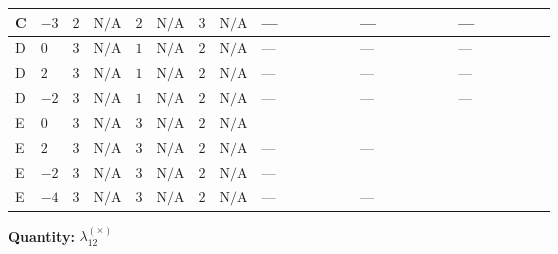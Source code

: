 \documentclass[8pt]{article}
\begin{document}
\begin{landscape}
\begin{longtable}{@{}llcccccc >{\raggedright\arraybackslash}p{0.21\linewidth} >{\raggedright\arraybackslash}p{0.21\linewidth} >{\raggedright\arraybackslash}p{0.21\linewidth}@{}}
\midrule
C & $-3$ & $2$ & $\text{N/A}$ & $2$ & $\text{N/A}$ & $3$ & $\text{N/A}$ & --- & --- & --- \\
\midrule
D & $0$ & $3$ & $\text{N/A}$ & $1$ & $\text{N/A}$ & $2$ & $\text{N/A}$ & --- & --- & --- \\
\midrule
D & $2$ & $3$ & $\text{N/A}$ & $1$ & $\text{N/A}$ & $2$ & $\text{N/A}$ & --- & --- & --- \\
\midrule
D & $-2$ & $3$ & $\text{N/A}$ & $1$ & $\text{N/A}$ & $2$ & $\text{N/A}$ & --- & --- & --- \\
\midrule
E & $0$ & $3$ & $\text{N/A}$ & $3$ & $\text{N/A}$ & $2$ & $\text{N/A}$ & \scriptsize\adjustbox{max width=\linewidth}{$\begin{gathered} +4 {\lambda_{X_{9}}} \left({\lambda_{X_{5}}^{(2)}}\right)^{*}\end{gathered}$} & \scriptsize\adjustbox{max width=\linewidth}{$\begin{gathered} -{\lambda_{X_{14}}} \left({\lambda_{X_{14}}}\right)^{*}\end{gathered}$} & \scriptsize\adjustbox{max width=\linewidth}{$\begin{gathered} +\frac{51 {g_2}^4}{10}\end{gathered}$} \\
\midrule
E & $2$ & $3$ & $\text{N/A}$ & $3$ & $\text{N/A}$ & $2$ & $\text{N/A}$ & --- & --- & \scriptsize\adjustbox{max width=\linewidth}{$\begin{gathered} +\frac{51 {g_2}^4}{10}\end{gathered}$} \\
\midrule
E & $-2$ & $3$ & $\text{N/A}$ & $3$ & $\text{N/A}$ & $2$ & $\text{N/A}$ & --- & \scriptsize\adjustbox{max width=\linewidth}{$\begin{gathered} -{\lambda_{X_{12}}} \left({\lambda_{X_{12}}}\right)^{*}\end{gathered}$} & \scriptsize\adjustbox{max width=\linewidth}{$\begin{gathered} +\frac{51 {g_2}^4}{10}\end{gathered}$} \\
\midrule
E & $-4$ & $3$ & $\text{N/A}$ & $3$ & $\text{N/A}$ & $2$ & $\text{N/A}$ & --- & --- & \scriptsize\adjustbox{max width=\linewidth}{$\begin{gathered} +\frac{51 {g_2}^4}{10}\end{gathered}$} \\
\midrule
\bottomrule
\end{longtable}
\clearpage
\noindent\textbf{Quantity: }$\lambda_{12}^{(\times)}$\par\smallskip

\end{landscape}
\end{document}
